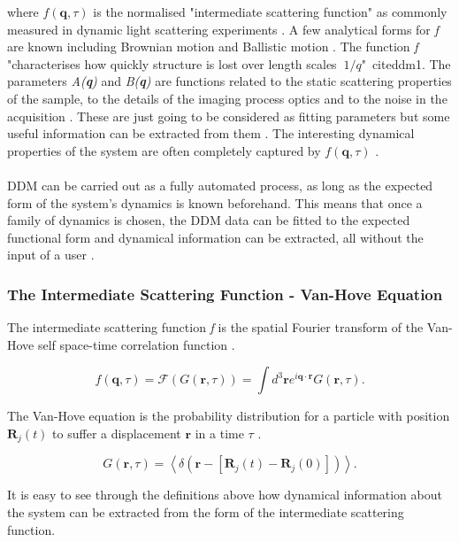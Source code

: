 \documentclass[10pt]{article}
\begin{document}
where $f(\textbf{q}, \tau)$ is the normalised "intermediate scattering function" as commonly measured in dynamic light scattering experiments \cite{DLSPecora}. A few analytical forms for \textit{f} are known including Brownian motion and Ballistic motion \cite{DLSPecora}. The function \textit{f} "characterises how quickly structure is lost over length scales $~1/q$"\ cite{ddm1}. The parameters \textit{A(\textbf{q})} and \textit{B(\textbf{q})} are functions related to the static scattering properties of the sample, to the details of the imaging process optics and to the noise in the acquisition \cite{ddm1}. These are just going to be considered as fitting parameters but some useful information can be extracted from them \cite{ddm1}. The interesting dynamical properties of the system are often completely captured by $f(\textbf{q}, \tau)$ \cite{ddm1}.
\\\\
DDM can be carried out as a fully automated process, as long as the expected form of the system's dynamics is known beforehand. This means that once a family of dynamics is chosen, the DDM data can be fitted to the expected functional form and dynamical information can be extracted, all without the input of a user \cite{ddm1}.

\subsubsection{The Intermediate Scattering Function - Van-Hove Equation}
The intermediate scattering function \textit{f} is the spatial Fourier transform of the Van-Hove self space-time correlation function \cite{DLSPecora}.

\begin{equation}
	f(\textbf{q}, \tau) = \mathscr{F} (G(\textbf{r}, \tau)) = \int d^3 \textbf{r} e^{i \textbf{q} \cdot \textbf{r}} G(\textbf{r}, \tau).
\end{equation}

The Van-Hove equation is the probability distribution for a particle with position $\textbf{R}_j(t)$ to suffer a displacement $\textbf{r}$ in a time $\tau$ \cite{DLSPecora}.

\begin{equation}
	G(\textbf{r}, \tau) = \left\langle \delta (\textbf{r} - [\textbf{R}_j(t) - \textbf{R}_j(0)]) \right\rangle.
\end{equation}

It is easy to see through the definitions above how dynamical information about the system can be extracted from the form of the intermediate scattering function.
\end{document}
